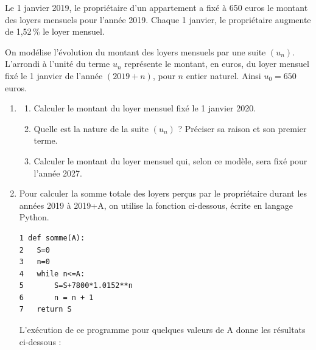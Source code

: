 \medskip

Le 1 janvier 2019, le propriétaire d'un appartement a fixé à 650 euros le montant des loyers mensuels pour l'année 2019. Chaque 1 janvier, le propriétaire augmente de 1,52\,\% le loyer mensuel.

On modélise l'évolution du montant des loyers mensuels par une suite $\left(u_n\right)$. L'arrondi à l'unité du terme $u_n$ représente le montant, en euros, du loyer mensuel fixé le 1 janvier de l'année $(2019+n)$, pour $n$ entier naturel. Ainsi $u_0 = 650$ euros.

\medskip

\begin{enumerate}
\item 
	\begin{enumerate}
		\item Calculer le montant du loyer mensuel fixé le 1 janvier 2020.
		\item Quelle est la nature de la suite $\left(u_n\right)$ ? Préciser sa raison et son premier terme.
		\item Calculer le montant du loyer mensuel qui, selon ce modèle, sera fixé pour l'année 2027.
	\end{enumerate}
\item Pour calculer la somme totale des loyers perçus par le propriétaire durant les années 2019
à 2019+A, on utilise la fonction ci-dessous, écrite en langage Python.

\begin{lstlisting}[style=python]
1 def somme(A):
2 	S=0
3 	n=0
4 	while n<=A:
5		S=S+7800*1.0152**n
6 		n = n + 1
7 	return S
\end{lstlisting}

L'exécution de ce programme pour quelques valeurs de A donne les résultats ci-dessous :

\begin{center}


\end{center}
\end{enumerate}
